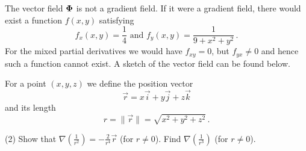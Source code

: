 \begin{solution}
The vector field $\bm{\mathrm{\Phi}}$ is not a gradient field. If it were a gradient field, there would exist a function $f(x,y)$ satisfying
\[
f_x(x,y) = \frac 14 \text{ and }
f_y(x,y) = \frac{1}{9+x^2+y^2}\,.
\]
For the mixed partial derivatives we would have $f_{xy} = 0$, but $f_{yx} \neq 0$ and hence such a function cannot exist. A sketch of the vector field can be found below.

\begin{center}
\end{center}

\end{solution}

\begin{question}
For a point $(x,y,z)$ we define the position vector
\[
\vec r = x\vec i + y\vec j + z \vec k
\]
and its length
\[
r = \| \vec r \| = \sqrt{x^2 + y^2+z^2}\,.
\]
\begin{tasks}(2)
\task
Show that $\nabla\left(\frac 1 {r^2}\right) = -\frac{2}{r^4} \vec r$ (for $r\neq 0$).
\task
Find $\nabla\left( \frac 1{r^3} \right)$ (for $r\neq 0$).
\end{tasks}
\end{question}

